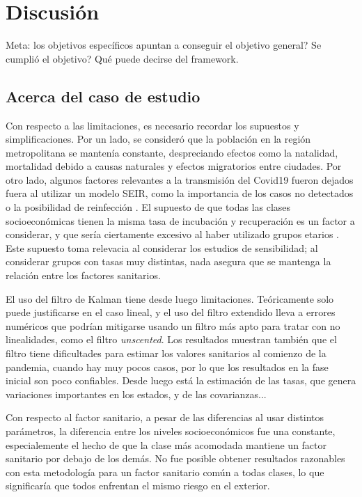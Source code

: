 \chapter{Discusión} \label{chap:discus}

Meta: los objetivos específicos apuntan a conseguir el objetivo general? Se cumplió el objetivo? Qué puede decirse del framework.

\section{Acerca del caso de estudio}

Con respecto a las limitaciones, es necesario recordar los supuestos y simplificaciones. Por un lado, se consideró que la población en la región metropolitana se mantenía constante, despreciando efectos como la natalidad, mortalidad debido a causas naturales y efectos migratorios entre ciudades. Por otro lado, algunos factores relevantes a la transmisión del Covid19 fueron dejados fuera al utilizar un modelo SEIR, como la importancia de los casos no detectados \cite{Li2020c} o la posibilidad de reinfección \cite{}. El supuesto de que todas las clases socioeconómicas tienen la misma tasa de incubación y recuperación es un factor a considerar, y que sería ciertamente excesivo al haber utilizado grupos etarios \cite{}. Este supuesto toma relevacia al considerar los estudios de sensibilidad; al considerar grupos con tasas muy distintas, nada asegura que se mantenga la relación entre los factores sanitarios.

El uso del filtro de Kalman tiene desde luego limitaciones. Teóricamente solo puede justificarse en el caso lineal, y el uso del filtro extendido lleva a errores numéricos que podrían mitigarse usando un filtro más apto para tratar con no linealidades, como el filtro \textit{unscented}. Los resultados muestran también que el filtro tiene dificultades para estimar los valores sanitarios al comienzo de la pandemia, cuando hay muy pocos casos, por lo que los resultados en la fase inicial son poco confiables. Desde luego está la estimación de las tasas, que genera variaciones importantes en los estados, y de las covarianzas... 

Con respecto al factor sanitario, a pesar de las diferencias al usar distintos parámetros, la diferencia entre los niveles socioeconómicos fue una constante, especialemente el hecho de que la clase más acomodada mantiene un factor sanitario por debajo de los demás. No fue posible obtener resultados razonables con esta metodología para un factor sanitario común a todas clases, lo que significaría que todos enfrentan el mismo riesgo en el exterior.

